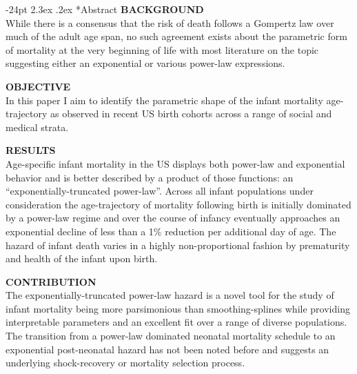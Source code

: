 \documentclass[10pt, twoside, parskip=half]{article}
\title{\large\textbf{The Age-Trajectory of Infant Mortality in the United States: Parametric
Models and Generative Mechanisms}\vskip 0em}
\date{\vspace{-5ex}}
\makeatletter
\renewcommand\section{\@startsection {section}{1}{\z@}%
                                   {-24pt}%
                                   {2.3ex \@plus.2ex}%
                                   {\normalfont\large\bfseries}}
\makeatother
\begin{document}
  \maketitle

\vspace*{-24pt}
\vspace*{5mm}
\setlength{\parskip}{0.5em}
\section*{Abstract}
  \noindent\textbf{BACKGROUND}\\
  While there is a consensus that the risk of death follows a Gompertz law
  over much of the adult age span, no such agreement exists about the
  parametric form of mortality at the very beginning of life with most
  literature on the topic suggesting either an exponential or various
  power-law expressions.
  \par
  \noindent\textbf{OBJECTIVE}\\
  In this paper I aim to identify the parametric shape of the infant
  mortality age-trajectory as observed in recent US birth cohorts across a
  range of social and medical strata.
  \par
  \noindent\textbf{RESULTS}\\
  Age-specific infant mortality in the US displays both power-law and
  exponential behavior and is better described by a product of those
  functions: an ``exponentially-truncated power-law''. Across all infant
  populations under consideration the age-trajectory of mortality
  following birth is initially dominated by a power-law regime and over
  the course of infancy eventually approaches an exponential decline of
  less than a 1\% reduction per additional day of age. The hazard of
  infant death varies in a highly non-proportional fashion by prematurity
  and health of the infant upon birth.
  \par
  \noindent\textbf{CONTRIBUTION}\\
  The exponentially-truncated power-law hazard is a novel tool for the
  study of infant mortality being more parsimonious than smoothing-splines
  while providing interpretable parameters and an excellent fit over a
  range of diverse populations. The transition from a power-law dominated
  neonatal mortality schedule to an exponential post-neonatal hazard has
  not been noted before and suggests an underlying shock-recovery or
  mortality selection process.
\vspace*{12pt}
\end{document}
